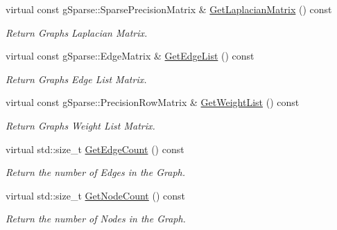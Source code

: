 \begin{DoxyCompactItemize}
\mbox{\label{classg_sparse_1_1_undirected_graph_a6587d7e4e37961469f26b1d5f9ae66cc}} 
virtual const g\+Sparse\+::\+Sparse\+Precision\+Matrix \& \mbox{\hyperlink{classg_sparse_1_1_undirected_graph_a6587d7e4e37961469f26b1d5f9ae66cc}{Get\+Laplacian\+Matrix}} () const
\begin{DoxyCompactList}\small\item\em Return Graph\textquotesingle{}s Laplacian Matrix. \end{DoxyCompactList}\item 
\mbox{\label{classg_sparse_1_1_undirected_graph_a1e895346411557dc8a52843c279bddee}} 
virtual const g\+Sparse\+::\+Edge\+Matrix \& \mbox{\hyperlink{classg_sparse_1_1_undirected_graph_a1e895346411557dc8a52843c279bddee}{Get\+Edge\+List}} () const
\begin{DoxyCompactList}\small\item\em Return Graph\textquotesingle{}s Edge List Matrix. \end{DoxyCompactList}\item 
\mbox{\label{classg_sparse_1_1_undirected_graph_a61a27ee51b72dc55ec3699222108af73}} 
virtual const g\+Sparse\+::\+Precision\+Row\+Matrix \& \mbox{\hyperlink{classg_sparse_1_1_undirected_graph_a61a27ee51b72dc55ec3699222108af73}{Get\+Weight\+List}} () const
\begin{DoxyCompactList}\small\item\em Return Graph\textquotesingle{}s Weight List Matrix. \end{DoxyCompactList}\item 
\mbox{\label{classg_sparse_1_1_undirected_graph_a31402a2e8a8de8392720ed65a5ebb704}} 
virtual std\+::size\+\_\+t \mbox{\hyperlink{classg_sparse_1_1_undirected_graph_a31402a2e8a8de8392720ed65a5ebb704}{Get\+Edge\+Count}} () const
\begin{DoxyCompactList}\small\item\em Return the number of Edges in the Graph. \end{DoxyCompactList}\item 
\mbox{\label{classg_sparse_1_1_undirected_graph_abd69914de28b291a6e454b39359eedc3}} 
virtual std\+::size\+\_\+t \mbox{\hyperlink{classg_sparse_1_1_undirected_graph_abd69914de28b291a6e454b39359eedc3}{Get\+Node\+Count}} () const
\begin{DoxyCompactList}\small\item\em Return the number of Nodes in the Graph. \end{DoxyCompactList}\end{DoxyCompactItemize}
